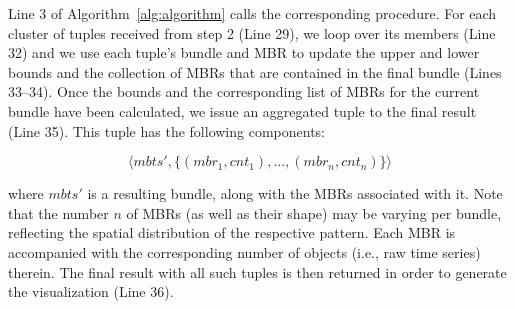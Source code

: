
Line 3 of Algorithm~\ref{alg:algorithm} calls the corresponding procedure. For each cluster of tuples received from step 2 (Line 29), we loop over its members (Line 32) and we use each tuple's bundle and MBR to update the upper and lower bounds and the collection of MBRs that are contained in the final bundle (Lines 33--34). Once the bounds and the corresponding list of MBRs for the current bundle have been calculated, we issue an aggregated tuple to the final result (Line 35). This tuple has the following components:

\begin{equation*}
\langle mbts', \{ (mbr_1,cnt_1), ..., (mbr_n, cnt_n) \} \rangle
\end{equation*}


\noindent where $mbts'$ is a resulting bundle, along with the MBRs associated with it. Note that the number $n$ of MBRs (as well as their shape) may be varying per bundle, reflecting the spatial distribution of the respective pattern. Each MBR is accompanied with the corresponding number of objects (i.e., raw time series) therein. The final result with all such tuples is then returned in order to generate the visualization (Line 36).



